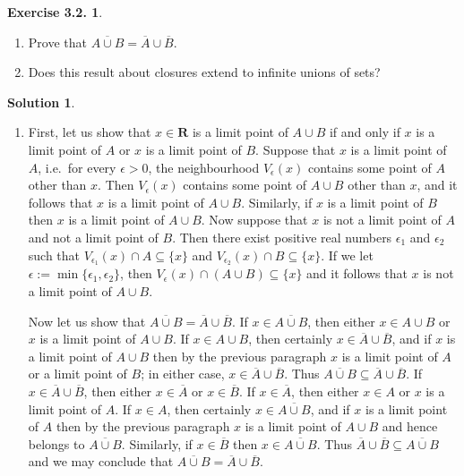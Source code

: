 \documentclass[12pt]{article}
\theoremstyle{definition}
\theoremstyle{exercise}
\newtheorem{exercise}{Exercise 3.2.}
\theoremstyle{solution}
\newtheorem*{solution}{Solution}
\newcommand{\R}{\mathbf{R}}
\begin{document}
\begin{exercise}
\label{ex:11}
    \begin{enumerate}
        \item Prove that \( \overline{A \cup B} = \overline{A} \cup \overline{B} \).

        \item Does this result about closures extend to infinite unions of sets?
    \end{enumerate}
\end{exercise}

\begin{solution}
    \begin{enumerate}
        \item First, let us show that \( x \in \R \) is a limit point of \( A \cup B \) if and only if \( x \) is a limit point of \( A \) or \( x \) is a limit point of \( B \). Suppose that \( x \) is a limit point of \( A \), i.e.\ for every \( \epsilon > 0 \), the neighbourhood \( V_{\epsilon}(x) \) contains some point of \( A \) other than \( x \). Then \( V_{\epsilon}(x) \) contains some point of \( A \cup B \) other than \( x \), and it follows that \( x \) is a limit point of \( A \cup B \). Similarly, if \( x \) is a limit point of \( B \) then \( x \) is a limit point of \( A \cup B \). Now suppose that \( x \) is not a limit point of \( A \) and not a limit point of \( B \). Then there exist positive real numbers \( \epsilon_1 \) and \( \epsilon_2 \) such that \( V_{\epsilon_1}(x) \cap A \subseteq \{ x \} \) and \( V_{\epsilon_2}(x) \cap B \subseteq \{ x \} \). If we let \( \epsilon := \min \{ \epsilon_1, \epsilon_2 \} \), then \( V_{\epsilon}(x) \cap (A \cup B) \subseteq \{ x \} \) and it follows that \( x \) is not a limit point of \( A \cup B \).

        Now let us show that \( \overline{A \cup B} = \overline{A} \cup \overline{B} \). If \( x \in \overline{A \cup B} \), then either \( x \in A \cup B \) or \( x \) is a limit point of \( A \cup B \). If \( x \in A \cup B \), then certainly \( x \in \overline{A} \cup \overline{B} \), and if \( x \) is a limit point of \( A \cup B \) then by the previous paragraph \( x \) is a limit point of \( A \) or a limit point of \( B \); in either case, \( x \in \overline{A} \cup \overline{B} \). Thus \( \overline{A \cup B} \subseteq \overline{A} \cup \overline{B} \). If \( x \in \overline{A} \cup \overline{B} \), then either \( x \in \overline{A} \) or \( x \in \overline{B} \). If \( x \in \overline{A} \), then either \( x \in A \) or \( x \) is a limit point of \( A \). If \( x \in A \), then certainly \( x \in \overline{A \cup B} \), and if \( x \) is a limit point of \( A \) then by the previous paragraph \( x \) is a limit point of \( A \cup B \) and hence belongs to \( \overline{A \cup B} \). Similarly, if \( x \in \overline{B} \) then \( x \in \overline{A \cup B} \). Thus \( \overline{A} \cup \overline{B} \subseteq \overline{A \cup B} \) and we may conclude that \( \overline{A \cup B} = \overline{A} \cup \overline{B} \).


\end{enumerate}
\end{solution}
\end{document}
